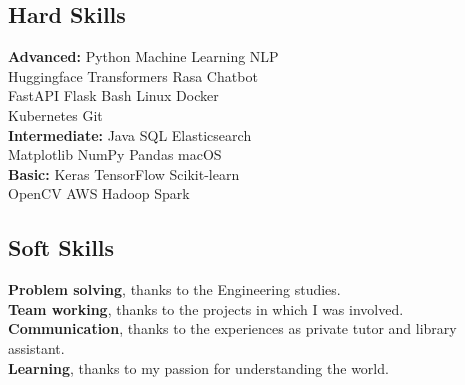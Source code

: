 \documentclass[]{deedy-resume-openfont}
\begin{document}
\begin{minipage}[t]{0.33\textwidth}
\subsection{Hard Skills}
\textbf{Advanced:} Python \textbullet{} Machine Learning \textbullet{} NLP \\
Huggingface Transformers \textbullet{} Rasa Chatbot \\
FastAPI \textbullet{} Flask \textbullet{} Bash \textbullet{} Linux \textbullet{} Docker \\
Kubernetes \textbullet{} Git \\
\textbf{Intermediate:} Java \textbullet{} SQL \textbullet{} Elasticsearch \\
Matplotlib \textbullet{} NumPy \textbullet{} Pandas \textbullet{} macOS \\
\textbf{Basic:} Keras \textbullet{} TensorFlow \textbullet{} Scikit-learn \\
OpenCV \textbullet{} AWS \textbullet{} Hadoop \textbullet{} Spark
\sectionsep

\subsection{Soft Skills}
\textbf{Problem solving}, thanks to the Engineering studies. \\
\textbf{Team working}, thanks to the projects in which I was involved. \\
\textbf{Communication}, thanks to the experiences as private tutor and library assistant. \\
\textbf{Learning}, thanks to my passion for understanding the world.





\end{minipage}
\end{document}
